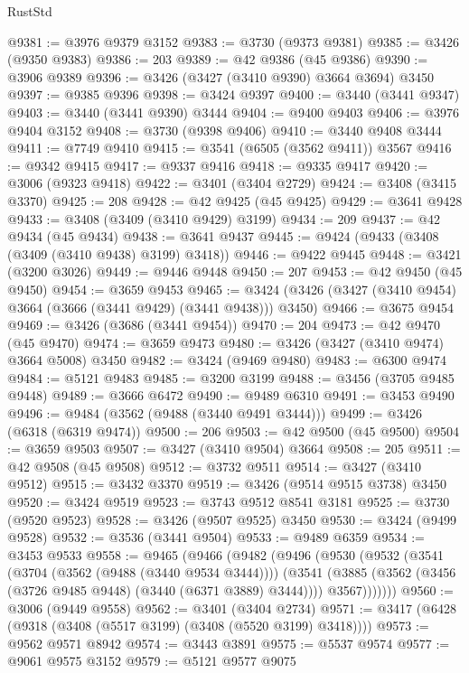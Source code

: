 \begin{lexlean}{RustStd}
\begin{coremodule}
@9381 := @3976 @9379 @3152
@9383 := @3730 (@9373 @9381)
@9385 := @3426 (@9350 @9383)
@9386 := 203
@9389 := @42 @9386 (@45 @9386)
@9390 := @3906 @9389
@9396 := @3426 (@3427 (@3410 @9390) @3664 @3694) @3450
@9397 := @9385 @9396
@9398 := @3424 @9397
@9400 := @3440 (@3441 @9347)
@9403 := @3440 (@3441 @9390) @3444
@9404 := @9400 @9403
@9406 := @3976 @9404 @3152
@9408 := @3730 (@9398 @9406)
@9410 := @3440 @9408 @3444
@9411 := @7749 @9410
@9415 := @3541 (@6505 (@3562 @9411)) @3567
@9416 := @9342 @9415
@9417 := @9337 @9416
@9418 := @9335 @9417
@9420 := @3006 (@9323 @9418)
@9422 := @3401 (@3404 @2729)
@9424 := @3408 (@3415 @3370)
@9425 := 208
@9428 := @42 @9425 (@45 @9425)
@9429 := @3641 @9428
@9433 := @3408 (@3409 (@3410 @9429) @3199)
@9434 := 209
@9437 := @42 @9434 (@45 @9434)
@9438 := @3641 @9437
@9445 := @9424 (@9433 (@3408 (@3409 (@3410 @9438) @3199) @3418))
@9446 := @9422 @9445
@9448 := @3421 (@3200 @3026)
@9449 := @9446 @9448
@9450 := 207
@9453 := @42 @9450 (@45 @9450)
@9454 := @3659 @9453
@9465 := @3424 (@3426 (@3427 (@3410 @9454) @3664 (@3666 (@3441 @9429) (@3441 @9438))) @3450)
@9466 := @3675 @9454
@9469 := @3426 (@3686 (@3441 @9454))
@9470 := 204
@9473 := @42 @9470 (@45 @9470)
@9474 := @3659 @9473
@9480 := @3426 (@3427 (@3410 @9474) @3664 @5008) @3450
@9482 := @3424 (@9469 @9480)
@9483 := @6300 @9474
@9484 := @5121 @9483
@9485 := @3200 @3199
@9488 := @3456 (@3705 @9485 @9448)
@9489 := @3666 @6472
@9490 := @9489 @6310
@9491 := @3453 @9490
@9496 := @9484 (@3562 (@9488 (@3440 @9491 @3444)))
@9499 := @3426 (@6318 (@6319 @9474))
@9500 := 206
@9503 := @42 @9500 (@45 @9500)
@9504 := @3659 @9503
@9507 := @3427 (@3410 @9504) @3664
@9508 := 205
@9511 := @42 @9508 (@45 @9508)
@9512 := @3732 @9511
@9514 := @3427 (@3410 @9512)
@9515 := @3432 @3370
@9519 := @3426 (@9514 @9515 @3738) @3450
@9520 := @3424 @9519
@9523 := @3743 @9512 @8541 @3181
@9525 := @3730 (@9520 @9523)
@9528 := @3426 (@9507 @9525) @3450
@9530 := @3424 (@9499 @9528)
@9532 := @3536 (@3441 @9504)
@9533 := @9489 @6359
@9534 := @3453 @9533
@9558 := @9465
    (@9466
      (@9482
        (@9496
          (@9530
            (@9532
              (@3541
                (@3704 (@3562 (@9488 (@3440 @9534 @3444))))
                (@3541
                  (@3885 (@3562 (@3456 (@3726 @9485 @9448) (@3440 (@6371 @3889) @3444))))
                  @3567)))))))
@9560 := @3006 (@9449 @9558)
@9562 := @3401 (@3404 @2734)
@9571 := @3417 (@6428 (@9318 (@3408 (@5517 @3199) (@3408 (@5520 @3199) @3418))))
@9573 := @9562 @9571 @8942
@9574 := @3443 @3891
@9575 := @5537 @9574
@9577 := @9061 @9575 @3152
@9579 := @5121 @9577 @9075

\end{coremodule}
\end{lexlean}
